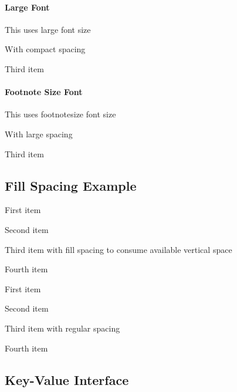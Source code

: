 \documentclass{article}
\begin{document}
\paragraph{Large Font}
\begin{itemizeS}[large]
  \item This uses large font size
  \item With compact spacing
  \item Third item
\end{itemizeS}

\paragraph{Footnote Size Font}
\begin{itemizeL}[footnotesize]
  \item This uses footnotesize font size
  \item With large spacing
  \item Third item
\end{itemizeL}

\subsection{Fill Spacing Example}
\begin{minipage}[t]{0.45\textwidth}
  \begin{itemizeF}
    \item First item
    \item Second item
    \item Third item with fill spacing to consume available vertical space
    \item Fourth item
  \end{itemizeF}
\end{minipage}
\hfill
\begin{minipage}[t]{0.45\textwidth}
  \begin{itemizeM}
    \item First item
    \item Second item
    \item Third item with regular spacing
    \item Fourth item
  \end{itemizeM}
\end{minipage}

\subsection{Key-Value Interface}
\end{document}

